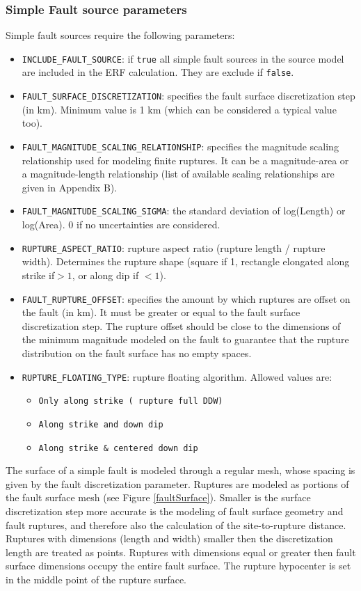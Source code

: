 \subsubsection{Simple Fault source parameters}
Simple fault sources require the following parameters:
\begin{itemize}
\item \Verb+INCLUDE_FAULT_SOURCE+: if \Verb+true+ all simple fault sources in the source model are included in the ERF calculation. They are exclude if \Verb+false+.
\item \Verb+FAULT_SURFACE_DISCRETIZATION+: specifies the fault surface discretization step (in km). Minimum value is 1 km (which can be considered a typical value too).
\item \Verb+FAULT_MAGNITUDE_SCALING_RELATIONSHIP+: specifies the magnitude scaling relationship used for modeling finite ruptures. It can be a magnitude-area or a magnitude-length relationship (list of available scaling relationships are given in Appendix B).
\item \Verb+FAULT_MAGNITUDE_SCALING_SIGMA+: the standard deviation of log(Length) or log(Area). 0 if no uncertainties are considered.
\item \Verb+RUPTURE_ASPECT_RATIO+: rupture aspect ratio (rupture length / rupture width). Determines the rupture shape (square if 1, rectangle elongated along strike if$ > 1$, or along dip if $< 1$).
\item \Verb+FAULT_RUPTURE_OFFSET+: specifies the amount by which ruptures are offset on the fault (in km). It must be greater or equal to the fault surface discretization step. The rupture offset should be close to the dimensions of the minimum magnitude modeled on the fault to guarantee that the rupture distribution on the fault surface has no empty spaces.
\item \Verb+RUPTURE_FLOATING_TYPE+: rupture floating algorithm. Allowed values are:
\begin{itemize}
\item \Verb+Only along strike ( rupture full DDW)+
\item \Verb+Along strike and down dip+
\item \Verb+Along strike & centered down dip+
\end{itemize}
\end{itemize}
The surface of a simple fault is modeled through a regular mesh, whose spacing is given by the fault discretization parameter. Ruptures are modeled as portions of the fault surface mesh (see Figure \ref{faultSurface}). Smaller is the surface discretization step more accurate is the modeling of fault surface geometry and fault ruptures, and therefore also the calculation of the site-to-rupture distance. Ruptures with dimensions (length and width) smaller then the discretization length are treated as points. Ruptures with dimensions equal or greater then fault surface dimensions occupy the entire fault surface. The rupture hypocenter is set in the middle point of the rupture surface.\\
